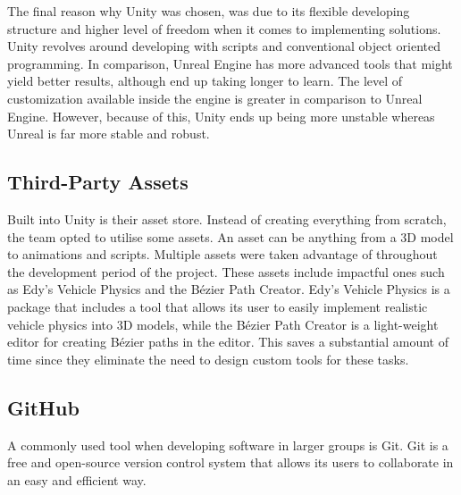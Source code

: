         The final reason why Unity was chosen, was due to its flexible developing structure and higher level of freedom when it comes to implementing solutions. Unity revolves around developing with scripts and conventional object oriented programming. In comparison, Unreal Engine has more advanced tools that might yield better results, although end up taking longer to learn. The level of customization available inside the engine is greater in comparison to Unreal Engine. However, because of this, Unity ends up being more unstable whereas Unreal is far more stable and robust.


    \subsection{Third-Party Assets}
        Built into Unity is their asset store. Instead of creating everything from scratch, the team opted to utilise some assets. An asset can be anything from a 3D model to animations and scripts. Multiple assets were taken advantage of throughout the development period of the project. These assets include impactful ones such as Edy's Vehicle Physics and the Bézier Path Creator\cite{bpc}. Edy's Vehicle Physics is a package that includes a tool that allows its user to easily implement realistic vehicle physics into 3D models, while the Bézier Path Creator is a light-weight editor for creating Bézier paths in the editor. This saves a substantial amount of time since they eliminate the need to design custom tools for these tasks.

    \subsection{GitHub}
        A commonly used tool when developing software in larger groups is Git\cite{git}. Git is a free and open-source version control system that allows its users to collaborate in an easy and efficient way. 

